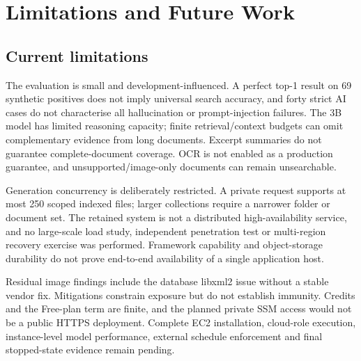 \chapter{Limitations and Future Work}
\section{Current limitations}
The evaluation is small and development-influenced. A perfect top-1 result on 69 synthetic positives does not imply universal search accuracy, and forty strict AI cases do not characterise all hallucination or prompt-injection failures. The 3B model has limited reasoning capacity; finite retrieval/context budgets can omit complementary evidence from long documents. Excerpt summaries do not guarantee complete-document coverage. OCR is not enabled as a production guarantee, and unsupported/image-only documents can remain unsearchable.

Generation concurrency is deliberately restricted. A private request supports at most 250 scoped indexed files; larger collections require a narrower folder or document set. The retained system is not a distributed high-availability service, and no large-scale load study, independent penetration test or multi-region recovery exercise was performed. Framework capability and object-storage durability do not prove end-to-end availability of a single application host.

Residual image findings include the database libxml2 issue without a stable vendor fix. Mitigations constrain exposure but do not establish immunity. Credits and the Free-plan term are finite, and the planned private SSM access would not be a public HTTPS deployment. Complete EC2 installation, cloud-role execution, instance-level model performance, external schedule enforcement and final stopped-state evidence remain pending.
